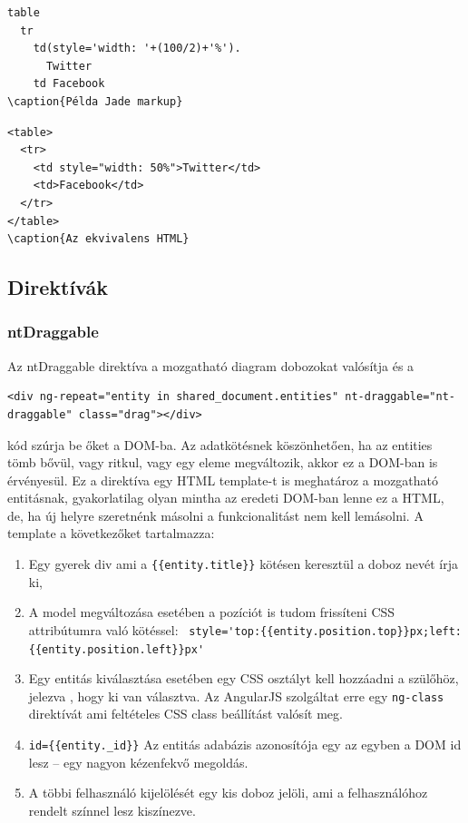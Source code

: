 \begin{lstlisting}
table
  tr
    td(style='width: '+(100/2)+'%').
      Twitter
    td Facebook
\caption{Példa Jade markup}
\end{lstlisting}

\begin{lstlisting}
<table>
  <tr>
    <td style="width: 50%">Twitter</td>
    <td>Facebook</td>
  </tr>
</table>
\caption{Az ekvivalens HTML}
\end{lstlisting}

\subsection{Direktívák}

\subsubsection{ntDraggable}

Az ntDraggable direktíva a mozgatható diagram dobozokat valósítja és a 

\begin{lstlisting}
<div ng-repeat="entity in shared_document.entities" nt-draggable="nt-draggable" class="drag"></div>
\end{lstlisting}


kód szúrja be őket a DOM-ba. Az adatkötésnek köszönhetően, ha az entities tömb bővül, vagy ritkul, vagy egy eleme megváltozik, akkor ez a DOM-ban is érvényesül. Ez a direktíva egy HTML template-t is meghatároz a mozgatható entitásnak, gyakorlatilag olyan mintha az eredeti DOM-ban lenne ez a HTML, de, ha új helyre szeretnénk másolni a funkcionalitást nem kell lemásolni. A template a következőket tartalmazza:



\begin{enumerate}
\item Egy gyerek div ami a \lstinline|{{entity.title}}| kötésen keresztül a doboz nevét írja ki,
\item A model megváltozása esetében a pozíciót is tudom frissíteni CSS attribútumra való kötéssel: \lstinline| style='top:{{entity.position.top}}px;left:{{entity.position.left}}px'|
\item Egy entitás kiválasztása esetében egy CSS osztályt kell hozzáadni a szülőhöz, jelezva , hogy ki van választva. Az AngularJS szolgáltat erre egy \lstinline{ng-class} direktívát ami feltételes CSS class beállítást valósít meg. 
\item \lstinline|id={{entity._id}}| Az entitás adabázis azonosítója egy az egyben a DOM id lesz -- egy nagyon kézenfekvő megoldás.
\item A többi felhasználó kijelölését egy kis doboz jelöli, ami a felhasználóhoz rendelt színnel lesz kiszínezve.
\end{enumerate}

